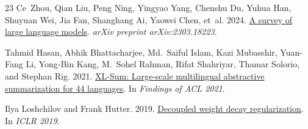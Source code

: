 \documentclass[11pt]{article}
\begin{document}
\begin{thebibliography}{23}
Ce~Zhou, Qian Liu, Peng Ning, Yingyao Yang, Chenshu Du, Yuhua Han, Shuyuan Wei, Jia Fan, Shanghang Ai, Yaowei Chen, et~al. 2024.
\newblock \href{https://arxiv.org/abs/2303.18223}{A survey of large language models}.
\newblock \emph{arXiv preprint arXiv:2303.18223}.

Tahmid Hasan, Abhik Bhattacharjee, Md.~Saiful Islam, Kazi Mubasshir, Yuan-Fang Li, Yong-Bin Kang, M.~Sohel Rahman, Rifat Shahriyar, Thamar Solorio, and Stephan Rig. 2021.
\newblock \href{https://arxiv.org/abs/2106.13822}{XL-Sum: Large-scale multilingual abstractive summarization for 44 languages}.
\newblock In \emph{Findings of ACL 2021}.

Ilya Loshchilov and Frank Hutter. 2019.
\newblock \href{https://arxiv.org/abs/1711.05101}{Decoupled weight decay regularization}.
\newblock In \emph{ICLR 2019}.

\end{thebibliography}
\end{document}
